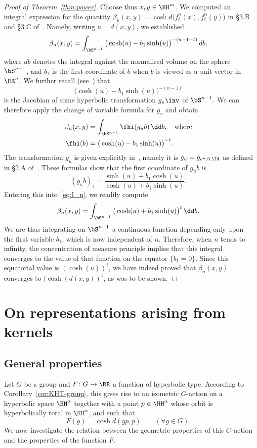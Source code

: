 \begin{proof}[Proof of Theorem~\ref{thm:power}]
Choose thus $x,y\in \HH^m$. We computed an integral expression for the quantity $\beta_n(x,y)=\cosh d\big(f^n_t(x), f^n_t(y)\big)$ in \S3.B and \S3.C of~\cite{Monod-Py}. Namely, writing $u=d(x,y)$, we established
\[
\beta_n(x,y) =\int_{\bS^{n-1}}\big(\cosh(u)-b_{1}\sinh(u)\big)^{-(n-1+t)} \, db,
\]
where $db$ denotes the integral against the normalised volume on the sphere $\bS^{n-1}$, and $b_1$ is the first coordinate of $b$ when $b$ is viewed as a unit vector in $\RR^n$. We further recall (see~\cite[(3.vi)]{Monod-Py}) that
\[
\big(\cosh(u)-b_{1}\sinh(u) \big)^{-(n-1)}
\]
is the Jacobian of some hyperbolic transformation $g_u\inv$ of $\bS^{n-1}$. We can therefore apply the change of variable formula for $g_u$ and obtain
\begin{equation}\label{eq:I_u}
\begin{split}
\beta_n(x,y) &=\int_{\bS^{n-1}} \fhi(g_u b) \, \dd b, \quad\text{where} \\
\fhi(b) &=\big(\cosh(u)-b_{1}\sinh(u) \big)^{-t}.
\end{split}
\end{equation}
The transformation $g_u$ is given explicitly in~\cite{Monod-Py}, namely it is $g_{u}=g_{e^{u},0,\Id}$ as defined in \S2.A of~\cite{Monod-Py}. These formulas show that the first coordinate of $g_u b$ is
\[
(g_u b)_1 = \frac{\sinh(u)+ b_1 \cosh(u)}{\cosh(u) + b_1 \sinh(u) }.
\]
Entering this into~\eqref{eq:I_u}, we readily compute
\[
\beta_n(x,y) =\int_{\bS^{n-1}} \big(\cosh(u)+b_{1}\sinh(u) \big)^{t}\, \dd b.
\]
We are thus integrating on $\bS^{n-1}$ a continuous function depending only upon the first variable $b_1$, which is now independent of $n$. Therefore, when $n$ tends to infinity, the concentration of measure principle implies that this integral converges to the value of that function on the equator $\{b_1=0\}$. Since this equatorial value is $(\cosh(u))^t$, we have indeed proved that $\beta_n(x,y)$ converges to $(\cosh(d(x,y))^t$, as was to be shown.
\end{proof}


\section{On representations arising from kernels}

\subsection{General properties}

Let $G$ be a group and $F\colon G\to \RR$ a function of hyperbolic type. According to Corollary~\ref{cor:KHT-group}, this gives rise to an isometric $G$-action on a hyperbolic space $\HH^\alpha$ together with a point $p\in \HH^\alpha$ whose orbit is hyperbolically total in $\HH^\alpha$, and such that
\[
F(g) = \cosh d(gp, p) \qquad (\forall g\in G).
\]
We now investigate the relation between the geometric properties of this $G$-action and the properties of the function $F$.

